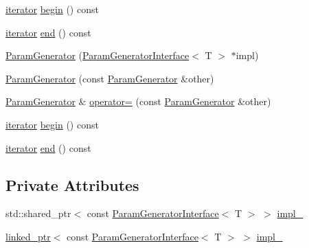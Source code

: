 \begin{DoxyCompactItemize}
\mbox{\hyperlink{classtesting_1_1internal_1_1_param_generator_a448b08a8eaae1f1d27840d4dbd66c357}{iterator}} \mbox{\hyperlink{classtesting_1_1internal_1_1_param_generator_a14e735c8bd113556ae905a560cd2d607}{begin}} () const
\item 
\mbox{\hyperlink{classtesting_1_1internal_1_1_param_generator_a448b08a8eaae1f1d27840d4dbd66c357}{iterator}} \mbox{\hyperlink{classtesting_1_1internal_1_1_param_generator_aaf8f75df1099a07ff771a550b48f9fbe}{end}} () const
\item 
\mbox{\hyperlink{classtesting_1_1internal_1_1_param_generator_a6b017d4d030927714d495ee95ae92fbc}{Param\+Generator}} (\mbox{\hyperlink{classtesting_1_1internal_1_1_param_generator_interface}{Param\+Generator\+Interface}}$<$ T $>$ $\ast$impl)
\item 
\mbox{\hyperlink{classtesting_1_1internal_1_1_param_generator_a5891d25c31919b3099489f8bbcd58b5e}{Param\+Generator}} (const \mbox{\hyperlink{classtesting_1_1internal_1_1_param_generator}{Param\+Generator}} \&other)
\item 
\mbox{\hyperlink{classtesting_1_1internal_1_1_param_generator}{Param\+Generator}} \& \mbox{\hyperlink{classtesting_1_1internal_1_1_param_generator_a590a03c6e0a3a3ac6279943ad1f01dc8}{operator=}} (const \mbox{\hyperlink{classtesting_1_1internal_1_1_param_generator}{Param\+Generator}} \&other)
\item 
\mbox{\hyperlink{classtesting_1_1internal_1_1_param_generator_a448b08a8eaae1f1d27840d4dbd66c357}{iterator}} \mbox{\hyperlink{classtesting_1_1internal_1_1_param_generator_a14e735c8bd113556ae905a560cd2d607}{begin}} () const
\item 
\mbox{\hyperlink{classtesting_1_1internal_1_1_param_generator_a448b08a8eaae1f1d27840d4dbd66c357}{iterator}} \mbox{\hyperlink{classtesting_1_1internal_1_1_param_generator_aaf8f75df1099a07ff771a550b48f9fbe}{end}} () const
\end{DoxyCompactItemize}
\subsection*{Private Attributes}
\begin{DoxyCompactItemize}
\item 
std\+::shared\+\_\+ptr$<$ const \mbox{\hyperlink{classtesting_1_1internal_1_1_param_generator_interface}{Param\+Generator\+Interface}}$<$ T $>$ $>$ \mbox{\hyperlink{classtesting_1_1internal_1_1_param_generator_a7bb352a2ce3f011b135eb5b69540f010}{impl\+\_\+}}
\item 
\mbox{\hyperlink{classtesting_1_1internal_1_1linked__ptr}{linked\+\_\+ptr}}$<$ const \mbox{\hyperlink{classtesting_1_1internal_1_1_param_generator_interface}{Param\+Generator\+Interface}}$<$ T $>$ $>$ \mbox{\hyperlink{classtesting_1_1internal_1_1_param_generator_a73861e909649bbce3f61c64878c52d9f}{impl\+\_\+}}
\end{DoxyCompactItemize}


